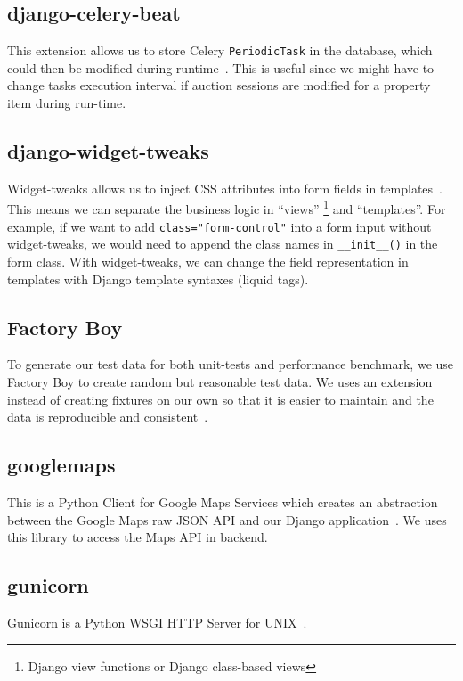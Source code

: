 \subsection{django-celery-beat}\label{sec:dep-celery-beat}
This extension allows us to store Celery \texttt{PeriodicTask} in the database,
which could then be modified during
runtime~\parencite{django-celery-beat-doc}. This is useful since we
might have to change tasks execution interval if auction sessions are modified
for a property item during run-time.

\subsection{django-widget-tweaks}
Widget-tweaks allows us to inject CSS attributes into form fields in
templates~\parencite{widget-tweaks}. This means we can separate the business logic
in ``views'' \footnote{Django view functions or Django class-based views} and
``templates''. For example, if we want to add \texttt{class="form-control"}
into a form input without widget-tweaks, we would need to append the class names
in \texttt{\_\_init\_\_()} in the form class. With widget-tweaks, we can change the
field representation in templates with Django template syntaxes (liquid tags).

\subsection{Factory Boy}
To generate our test data for both unit-tests and performance benchmark, we use
Factory Boy to create random but reasonable test data. We uses an extension
instead of creating fixtures on our own so that it is easier to maintain and the
data is reproducible and consistent~\parencite{factory-boy-doc}.

\subsection{googlemaps}
This is a Python Client for Google Maps Services which creates an abstraction
between the Google Maps raw JSON API and our Django
application~\parencite{python-google-maps}. We uses this library to access the Maps
API in backend.

\subsection{gunicorn}
Gunicorn is a Python WSGI HTTP Server for UNIX~\parencite{gunicorn}.

